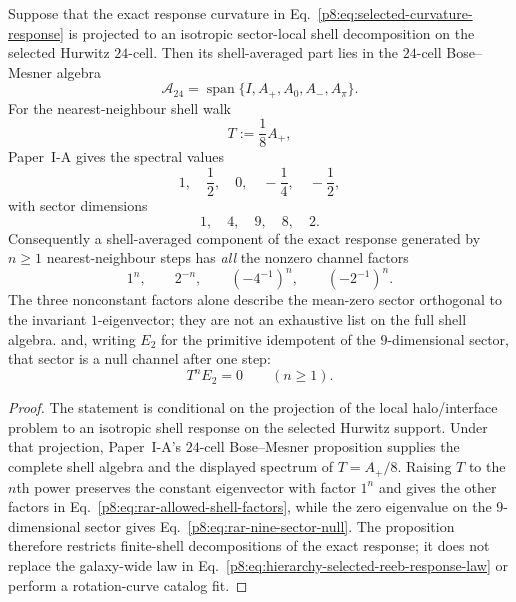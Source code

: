 \documentclass[12pt,a4paper]{article}
\begin{document}
\begin{proposition}
\label{p8:prop:shell-algebra-nonterminal-rar}
Suppose that the exact response curvature in Eq.~\eqref{p8:eq:selected-curvature-response} is projected to an isotropic sector-local shell decomposition on the selected Hurwitz $24$-cell.  Then its shell-averaged part lies in the $24$-cell Bose--Mesner algebra
\begin{equation}
\label{p8:eq:rar-shell-algebra}
    \mathcal A_{24}=\operatorname{span}\{I,A_+,A_0,A_-,A_\pi\}.
\end{equation}
For the nearest-neighbour shell walk
\begin{equation}
\label{p8:eq:rar-shell-walk}
    T:=\frac18A_+,
\end{equation}
Paper~I-A gives the spectral values
\begin{equation}
\label{p8:eq:rar-shell-walk-spectrum}
    1,\quad \frac12,\quad 0,\quad -\frac14,\quad -\frac12,
\end{equation}
with sector dimensions
\begin{equation}
\label{p8:eq:rar-shell-walk-multiplicities}
    1,\quad4,\quad9,\quad8,\quad2.
\end{equation}
Consequently a shell-averaged component of the exact response generated by
$n\geq1$ nearest-neighbour steps has \emph{all} the nonzero channel factors
\begin{equation}
\label{p8:eq:rar-allowed-shell-factors}
    1^n,\qquad 2^{-n},\qquad (-4^{-1})^n,
    \qquad (-2^{-1})^n.
\end{equation}
The three nonconstant factors alone describe the mean-zero sector
orthogonal to the invariant $1$-eigenvector; they are not an exhaustive
list on the full shell algebra.
and, writing $E_2$ for the primitive idempotent of the $9$-dimensional sector, that sector is a null channel after one step:
\begin{equation}
\label{p8:eq:rar-nine-sector-null}
    T^nE_2=0\qquad(n\ge1).
\end{equation}
\end{proposition}

\begin{proof}
The statement is conditional on the projection of the local halo/interface problem to an isotropic shell response on the selected Hurwitz support.  Under that projection, Paper~I-A's $24$-cell Bose--Mesner proposition supplies the complete shell algebra and the displayed spectrum of $T=A_+/8$.  Raising $T$ to the $n$th power preserves the constant eigenvector
with factor \(1^n\) and gives the other factors in
Eq.~\eqref{p8:eq:rar-allowed-shell-factors}, while the zero eigenvalue
on the $9$-dimensional sector gives Eq.~\eqref{p8:eq:rar-nine-sector-null}.  The proposition therefore restricts finite-shell decompositions of the exact response; it does not replace the galaxy-wide law in Eq.~\eqref{p8:eq:hierarchy-selected-reeb-response-law} or perform a rotation-curve catalog fit.
\end{proof}
\end{document}
